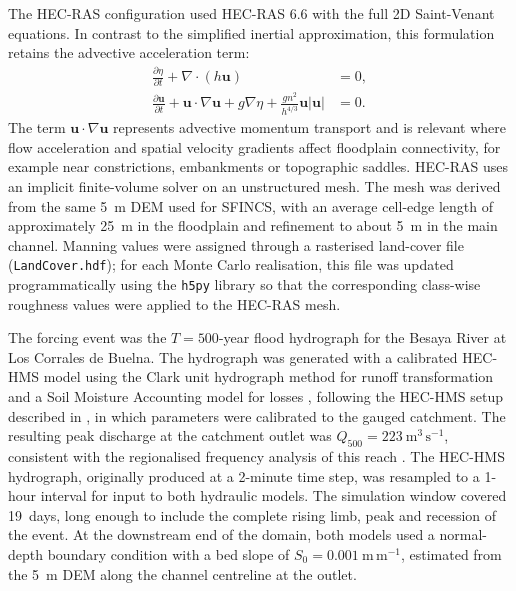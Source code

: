 \documentclass[a4paper,fleqn]{cas-sc}
\newcommand{\sfincs}{\textsc{SFINCS}}
\newcommand{\hecras}{\textsc{HEC-RAS}}
\begin{document}
The \hecras{} configuration used HEC-RAS 6.6 \citep{usace2026rasuser,usace2026rastech} with the full 2D Saint-Venant equations. In contrast to the simplified inertial approximation, this formulation retains the advective acceleration term:
\begin{align}
\frac{\partial \eta}{\partial t} + \nabla\cdot(h\mathbf{u}) &= 0 ,
\label{eq:hecras_cont}\\
\frac{\partial \mathbf{u}}{\partial t} +
\mathbf{u}\cdot\nabla\mathbf{u} + g\nabla\eta +
\frac{g n^2}{h^{4/3}}\mathbf{u}|\mathbf{u}| &= 0 .
\label{eq:hecras_mom}
\end{align}
The term $\mathbf{u}\cdot\nabla\mathbf{u}$ represents advective momentum transport and is relevant where flow acceleration and spatial velocity gradients affect floodplain connectivity, for example near constrictions, embankments or topographic saddles. \hecras{} uses an implicit finite-volume solver on an unstructured mesh. The mesh was derived from the same 5~m DEM used for \sfincs{}, with an average cell-edge length of approximately 25~m in the floodplain and refinement to about 5~m in the main channel. Manning values were assigned through a rasterised land-cover file (\texttt{LandCover.hdf}); for each Monte Carlo realisation, this file was updated programmatically using the \texttt{h5py} library so that the corresponding class-wise roughness values were applied to the \hecras{} mesh.

The forcing event was the $T=500$-year flood hydrograph for the Besaya River at Los Corrales de Buelna. The hydrograph was generated with a calibrated HEC-HMS model using the Clark unit hydrograph method for runoff transformation and a Soil Moisture Accounting model for losses \citep{usace2000hechms}, following the HEC-HMS setup described in \citet{navas2018rop}, in which parameters were calibrated to the gauged catchment. The resulting peak discharge at the catchment outlet was $Q_{500}=223~\mathrm{m^3\,s^{-1}}$, consistent with the regionalised frequency analysis of this reach \citep{navas2018rop}. The HEC-HMS hydrograph, originally produced at a 2-minute time step, was resampled to a 1-hour interval for input to both hydraulic models. The simulation window covered 19~days, long enough to include the complete rising limb, peak and recession of the event. At the downstream end of the domain, both models used a normal-depth boundary condition with a bed slope of $S_0=0.001~\mathrm{m\,m^{-1}}$, estimated from the 5~m DEM along the channel centreline at the outlet.
\end{document}
